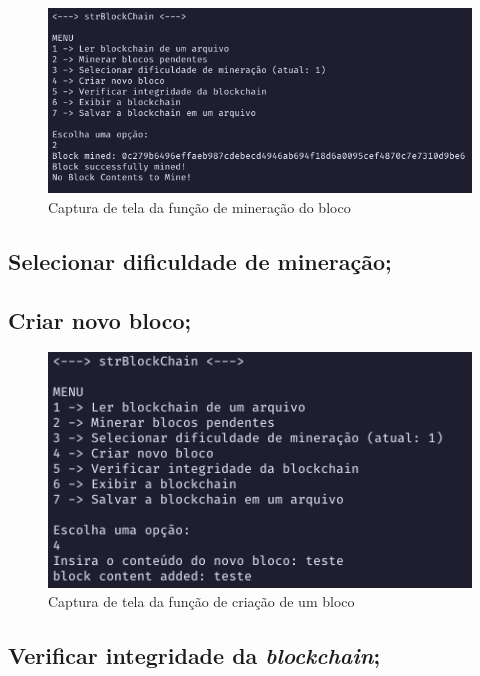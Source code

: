 \documentclass{article}
\begin{document}
\begin{figure}[h!]
  \includegraphics[width=\textwidth]{mineBlock.png}
  \caption{Captura de tela da função de mineração do bloco}
\end{figure}

\subsection{Selecionar dificuldade de mineração;}
\subsection{Criar novo bloco;}

\begin{figure}[h!]
  \includegraphics[width=\textwidth]{insertBlock.png}
  \caption{Captura de tela da função de criação de um bloco}
\end{figure}

\subsection{Verificar integridade da \textit{blockchain};}
\end{document}
